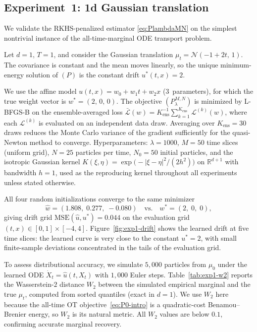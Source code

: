 \documentclass[11pt,leqno]{article}
\theoremstyle{plain}
\theoremstyle{remark}
\theoremstyle{definition}
\numberwithin{equation}{section}
\numberwithin{figure}{section}
\numberwithin{table}{section}
\begin{document}
\subsection{Experiment~1: 1d Gaussian translation}
\label{sec:exp-gaussian}

We validate the RKHS-penalized estimator \eqref{eq:PlambdaMN} on the simplest
nontrivial instance of the all-time-marginal ODE transport problem.


Let $d=1$, $T=1$, and consider the Gaussian translation
$\mu_t = \mathcal{N}(-1+2t,\,1)$.
The covariance is constant and the mean moves linearly, so the unique
minimum-energy solution of $(P)$ is the constant drift
$u^*(t,x)=2$.


We use the affine model $u(t,x)=w_0+w_1 t+w_2 x$ ($3$~parameters), for which
the true weight vector is $w^*=(2,\,0,\,0)$.
The objective $(P_{\lambda}^{M,N})$ is minimized by L-BFGS-B on the
ensemble-averaged loss $\bar{\mathcal{L}}(w) = K_{\mathrm{ens}}^{-1}\sum_{k=1}^{K_{\mathrm{ens}}}\mathcal{L}^{(k)}(w)$,
where each $\mathcal{L}^{(k)}$ is evaluated on an independent data draw.
Averaging over $K_{\mathrm{ens}}=30$ draws reduces the Monte Carlo variance of the
gradient sufficiently for the quasi-Newton method to converge.
Hyperparameters: $\lambda=1000$, $M=50$ time slices (uniform grid),
$N=25$ particles per time, $N_0=50$ initial particles, and the isotropic
Gaussian kernel
$K(\xi,\eta)=\exp\!\bigl(-|\xi-\eta|^2/(2h^2)\bigr)$
on $\mathbb{R}^{d+1}$ with bandwidth $h=1$, used as the reproducing kernel
throughout all experiments unless stated otherwise.


All four random initializations converge to the same minimizer
\[
  \hat{w} = (1.808,\;0.277,\;-0.080)
  \quad\text{vs.}\quad
  w^* = (2,\;0,\;0),
\]
giving drift grid $\mathrm{MSE}(\hat{u},u^*)=0.044$ on the evaluation grid
$(t,x)\in[0,1]\times[-4,4]$.
Figure~\ref{fig:exp1-drift} shows the learned drift at five time slices:
the learned curve is very close to the constant $u^*=2$, with small
finite-sample deviations concentrated in the tails of the evaluation grid.

To assess distributional accuracy, we simulate $5{,}000$ particles from
$\mu_0$ under the learned ODE $\dot{X}_t=\hat{u}(t,X_t)$ with $1{,}000$
Euler steps.
Table~\ref{tab:exp1-w2} reports the Wasserstein-$2$ distance $W_2$ between
the simulated empirical marginal and the true $\mu_t$, computed from
sorted quantiles (exact in $d=1$).  We use $W_2$ here because the
all-time OT objective~\eqref{eq:P0-intro} is a quadratic-cost
Benamou--Brenier energy, so $W_2$ is its natural metric.  All $W_2$
values are below $0.1$, confirming accurate marginal recovery.
\end{document}
